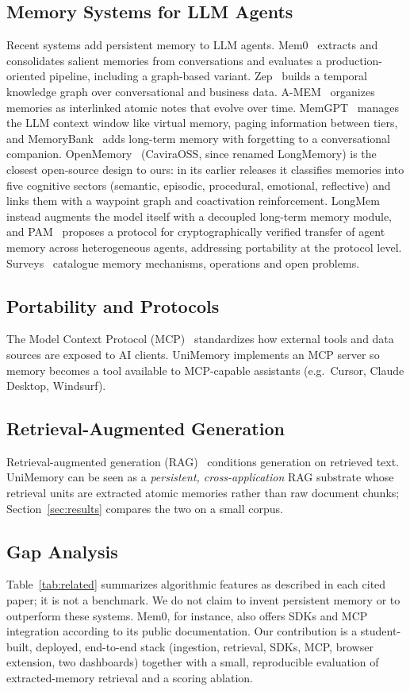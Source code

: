 \documentclass[conference]{IEEEtran}
\begin{document}
\subsection{Memory Systems for LLM Agents}
Recent systems add persistent memory to LLM agents. Mem0~\cite{mem0} extracts
and consolidates salient memories from conversations and evaluates a
production-oriented pipeline, including a graph-based variant. Zep~\cite{zep}
builds a temporal knowledge graph over conversational and business data.
A-MEM~\cite{amem} organizes memories as interlinked atomic notes that evolve
over time. MemGPT~\cite{memgpt} manages the LLM context window like virtual
memory, paging information between tiers, and MemoryBank~\cite{memorybank}
adds long-term memory with forgetting to a conversational companion.
OpenMemory~\cite{openmemory} (CaviraOSS, since renamed LongMemory) is the
closest open-source design to ours: in its earlier releases it classifies
memories into five cognitive sectors (semantic, episodic, procedural, emotional,
reflective) and links them with a waypoint graph and coactivation reinforcement.
LongMem~\cite{longmem} instead augments the model itself with a decoupled
long-term memory module, and PAM~\cite{pam} proposes a protocol for
cryptographically verified transfer of agent memory across heterogeneous agents,
addressing portability at the protocol level. Surveys~\cite{surveyA,surveyB,%
surveyC,surveyD} catalogue memory mechanisms, operations and open problems.

\subsection{Portability and Protocols}
The Model Context Protocol (MCP)~\cite{mcp} standardizes how external tools and
data sources are exposed to AI clients. UniMemory implements an MCP server so
memory becomes a tool available to MCP-capable assistants (e.g.\ Cursor, Claude
Desktop, Windsurf).

\subsection{Retrieval-Augmented Generation}
Retrieval-augmented generation (RAG)~\cite{rag} conditions generation on
retrieved text. UniMemory can be seen as a \emph{persistent, cross-application}
RAG substrate whose retrieval units are extracted atomic memories rather than raw
document chunks; Section~\ref{sec:results} compares the two on a small corpus.

\subsection{Gap Analysis}
Table~\ref{tab:related} summarizes algorithmic features as described in each
cited paper; it is not a benchmark. We do not claim to invent persistent memory
or to outperform these systems. Mem0, for instance, also offers SDKs and MCP
integration according to its public documentation. Our contribution is a
student-built, deployed, end-to-end stack (ingestion, retrieval, SDKs, MCP,
browser extension, two dashboards) together with a small, reproducible
evaluation of extracted-memory retrieval and a scoring ablation.
\end{document}
